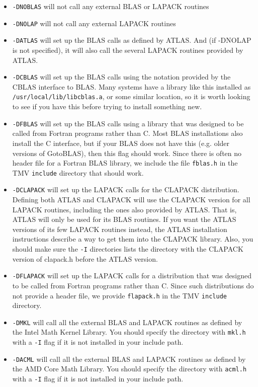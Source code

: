 \begin{itemize}
\item
\texttt{-DNOBLAS} will not call any external BLAS or LAPACK routines
\item
\texttt{-DNOLAP} will not call any external LAPACK routines
\item
\texttt{-DATLAS} will set up the BLAS calls as defined by ATLAS.  And (if -DNOLAP
is not specified), it will also call the several LAPACK routines
provided by ATLAS.
\item
\texttt{-DCBLAS} will set up the BLAS calls using the notation provided by the 
CBLAS interface to BLAS.  Many systems have a library like this installed as 
\texttt{/usr/local/lib/libcblas.a}, or some similar location,
so it is worth looking to see if you have this before
trying to install something new.
\item
\texttt{-DFBLAS} will set up the BLAS calls using a library that was designed to be called
from Fortran programs rather than C.  
Most BLAS installations also install the C interface, but if your
BLAS does not have this (e.g. older versions of GotoBLAS), then this flag should work.  
Since there is often no
header file for a Fortran BLAS library, we include the file \texttt{fblas.h} in the TMV 
\texttt{include} directory that should work.
\item
\texttt{-DCLAPACK} will set up the LAPACK calls for the CLAPACK distribution.  
Defining both ATLAS and CLAPACK will use
the CLAPACK version for all LAPACK routines, including the ones also provided by 
ATLAS.  That is, ATLAS will only be used for its BLAS routines.  If you want
the ATLAS versions of its few LAPACK routines instead, the ATLAS 
installation instructions describe a way to get them into the CLAPACK library.
Also, you should make sure the \texttt{-I} directories lists the directory with the CLAPACK
version of clapack.h before the ATLAS version.
\item
\texttt{-DFLAPACK} will set up the LAPACK calls for a distribution that
was designed to be called from Fortran programs rather than C.  Since such distributions
do not provide a header file, we provide \texttt{flapack.h} in the TMV \texttt{include} directory.
\item
\texttt{-DMKL} will call all the external BLAS and LAPACK routines as defined by the
Intel Math Kernel Library.  You should specify the directory with \texttt{mkl.h} with a 
\texttt{-I} flag if it is not installed in your include path.
\item
\texttt{-DACML} will call all the external BLAS and LAPACK routines as defined by the 
AMD Core Math Library.  You should specify the directory with \texttt{acml.h} with a 
\texttt{-I} flag if it is not installed in your include path.
\end{itemize}
